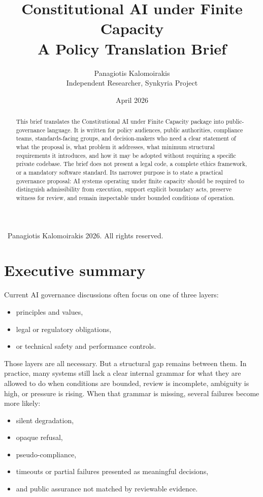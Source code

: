 \documentclass[11pt]{article}
\title{Constitutional AI under Finite Capacity\\
A Policy Translation Brief}
\author{Panagiotis Kalomoirakis\\
Independent Researcher, Synkyria Project}
\date{April 2026}
\begin{document}
\maketitle

\begin{center}
\small \textcopyright\ Panagiotis Kalomoirakis 2026. All rights reserved.
\end{center}

\begin{abstract}
This brief translates the Constitutional AI under Finite Capacity package into public-governance language. It is written for policy audiences, public authorities, compliance teams, standards-facing groups, and decision-makers who need a clear statement of what the proposal is, what problem it addresses, what minimum structural requirements it introduces, and how it may be adopted without requiring a specific private codebase. The brief does not present a legal code, a complete ethics framework, or a mandatory software standard. Its narrower purpose is to state a practical governance proposal: AI systems operating under finite capacity should be required to distinguish admissibility from execution, support explicit boundary acts, preserve witness for review, and remain inspectable under bounded conditions of operation.
\end{abstract}

\section{Executive summary}

Current AI governance discussions often focus on one of three layers:
\begin{itemize}[leftmargin=2em]
    \item principles and values,
    \item legal or regulatory obligations,
    \item or technical safety and performance controls.
\end{itemize}

Those layers are all necessary. But a structural gap remains between them. In practice, many systems still lack a clear internal grammar for what they are allowed to do when conditions are bounded, review is incomplete, ambiguity is high, or pressure is rising. When that grammar is missing, several failures become more likely:
\begin{itemize}[leftmargin=2em]
    \item silent degradation,
    \item opaque refusal,
    \item pseudo-compliance,
    \item timeouts or partial failures presented as meaningful decisions,
    \item and public assurance not matched by reviewable evidence.
\end{itemize}
\end{document}
